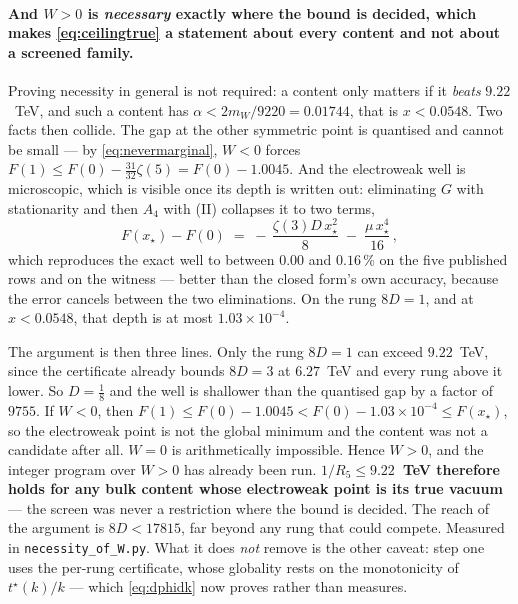 \documentclass[11pt,a4paper]{article}
\begin{document}
\paragraph{And $W>0$ is \emph{necessary} exactly where the bound is decided, which makes
\eqref{eq:ceilingtrue} a statement about every content and not about a screened family.} Proving
necessity in general is not required: a content only matters if it \emph{beats} $9.22$~TeV, and
such a content has $\alpha<2m_W/9220=0.01744$, that is $x<0.0548$. Two facts then collide. The gap
at the other symmetric point is quantised and cannot be small --- by \eqref{eq:nevermarginal},
$W<0$ forces $F(1)\le F(0)-\tfrac{31}{32}\zeta(5)=F(0)-1.0045$. And the electroweak well is
microscopic, which is visible once its depth is written out: eliminating $G$ with stationarity and
then $A_4$ with (II) collapses it to two terms,
\begin{equation}\label{eq:depth}
  F(x_\star)-F(0)\;=\;-\,\frac{\zeta(3)D\,x_\star^{2}}{8}\;-\;\frac{\mu\,x_\star^{4}}{16}\,,
\end{equation}
which reproduces the exact well to between $0.00$ and $0.16\,\%$ on the five published rows and on
the witness --- better than the closed form's own accuracy, because the error cancels between the
two eliminations. On the rung $8D=1$, and at $x<0.0548$, that depth is at most $1.03\times10^{-4}$.

The argument is then three lines. Only the rung $8D=1$ can exceed $9.22$~TeV, since the certificate
already bounds $8D=3$ at $6.27$~TeV and every rung above it lower. So $D=\tfrac18$ and the well is
shallower than the quantised gap by a factor of $9755$. If $W<0$, then
$F(1)\le F(0)-1.0045<F(0)-1.03\times10^{-4}\le F(x_\star)$, so the electroweak point is not the
global minimum and the content was not a candidate after all. $W=0$ is arithmetically impossible.
Hence $W>0$, and the integer program over $W>0$ has already been run.
\textbf{$1/R_5\le9.22$~TeV therefore holds for any bulk content whose electroweak point is its true
vacuum} --- the screen was never a restriction where the bound is decided. The reach of the
argument is $8D<17815$, far beyond any rung that could compete. Measured in
\texttt{necessity\_\allowbreak of\_\allowbreak W.py}. What it does \emph{not} remove is the other
caveat: step one uses the per-rung certificate, whose globality rests on the monotonicity of
$t^\star(k)/k$ --- which \eqref{eq:dphidk} now proves rather than measures.
\end{document}
